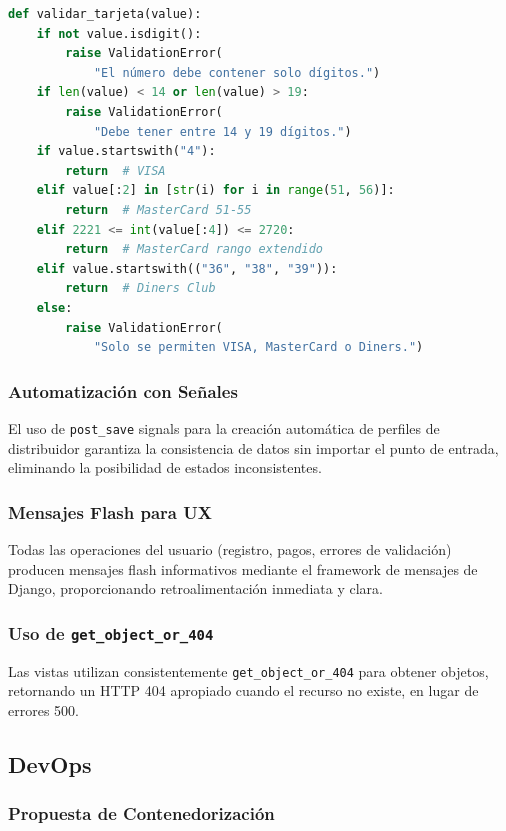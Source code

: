 \documentclass[12pt, a4paper]{article}
\begin{document}
{\begin{lstlisting}[language=Python, caption={Validador de tarjeta de crédito}]
def validar_tarjeta(value):
    if not value.isdigit():
        raise ValidationError(
            "El número debe contener solo dígitos.")
    if len(value) < 14 or len(value) > 19:
        raise ValidationError(
            "Debe tener entre 14 y 19 dígitos.")
    if value.startswith("4"):
        return  # VISA
    elif value[:2] in [str(i) for i in range(51, 56)]:
        return  # MasterCard 51-55
    elif 2221 <= int(value[:4]) <= 2720:
        return  # MasterCard rango extendido
    elif value.startswith(("36", "38", "39")):
        return  # Diners Club
    else:
        raise ValidationError(
            "Solo se permiten VISA, MasterCard o Diners.")
\end{lstlisting}

\subsubsection{Automatización con Señales}

El uso de \texttt{post\_save} signals para la creación automática de perfiles de distribuidor garantiza la consistencia de datos sin importar el punto de entrada, eliminando la posibilidad de estados inconsistentes.

\subsubsection{Mensajes Flash para UX}

Todas las operaciones del usuario (registro, pagos, errores de validación) producen mensajes flash informativos mediante el framework de mensajes de Django, proporcionando retroalimentación inmediata y clara.

\subsubsection{Uso de \texttt{get\_object\_or\_404}}

Las vistas utilizan consistentemente \texttt{get\_object\_or\_404} para obtener objetos, retornando un HTTP 404 apropiado cuando el recurso no existe, en lugar de errores 500.

\subsection{DevOps}

\subsubsection{Propuesta de Contenedorización}

}
\end{document}
